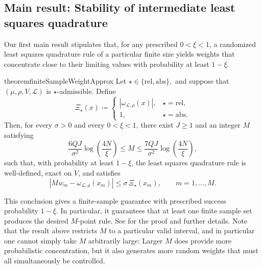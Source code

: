 \documentclass[10pt,dvipsnames]{amsart}
\begin{document}
\subsection{Main result: Stability of intermediate least squares quadrature}
Our first main result stipulates that, for any prescribed \(0<\xi<1\), a
randomized least squares quadrature rule of a particular finite size yields
weights that concentrate close to their limiting values with probability at
least \(1-\xi\).

\begin{restatable}{theorem}{finiteSampleWeightApprox}
\label{thm:finite-sample-weight-approximation} 
Let
\(
    \star\in\{\mathrm{rel},\mathrm{abs}\},
\)
and suppose that
\((\mu,\rho,V,\mathcal L)\) is \(\star\)-admissible. Define
\begin{equation}\label{eq:weight_amplification_class}
    \Xi_\star(x)
    \coloneqq
    \begin{cases}
        |\omega_{\mathcal L,\rho}(x)|,
        & \star=\mathrm{rel},\\
        1,
        & \star=\mathrm{abs}.
    \end{cases}
\end{equation}
Then, for every \(\sigma>0\) and every $0<\xi<1$, there exist \(J\geq1\) and an integer \(M\)
satisfying
\[
    \frac{6QJ}{\sigma^2}\log\left(\frac{4N}{\xi}\right)
    \leq
    M
    \leq
    \frac{7QJ}{\sigma^2}\log\left(\frac{4N}{\xi}\right),
\]
such that, with probability at least $1-\xi$, the least squares quadrature rule is
well-defined, exact on \(V\), and satisfies
\[
    \left|
        M w_m-\omega_{\mathcal L,\rho}(x_m)
    \right|
    \leq
    \sigma\,\Xi_\star(x_m),
    \qquad
    m=1,\ldots,M.
\]
\end{restatable}
This conclusion gives a finite-sample guarantee with prescribed success
probability \(1-\xi\). In particular, it guarantees that at least one finite
sample set produces the desired \(M\)-point rule. See
 for the proof and further
details.
Note that the result above restricts $M$ to a particular valid interval, and in
particular one cannot simply take $M$ arbitrarily large: Larger $M$ does
provide more probabilistic concentration, but it also generates more random
weights that must all simultaneously be controlled. 
\end{document}
